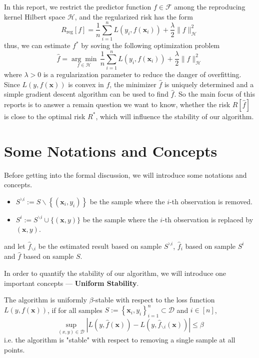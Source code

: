 \documentclass[a4paper, 12pt, mtpro2, authoryear]{elegantpaper}
\begin{document}
In this report, we restrict the predictor function $f\in\mathcal{F}$ among the reproducing kernel Hilbert space $\mathcal{H}$, and the regularized risk has the form
\begin{equation}
    \label{eq:regularized-risk-of-rkhs}
    R_{\text{reg}}[f]=\frac{1}{n}\sum_{i=1}^{n}L\left(y_{i},f(\mathbf{x}_{i})\right)+\frac{\lambda}{2}\|f\|_{\mathcal{H}}^{2}
\end{equation}
thus, we can estimate $f^{*}$ by soving the following optimization problem
\begin{equation}
    \hat{f}=\underset{f\in\mathcal{H}}{\arg\min}\,\frac{1}{n}\sum_{i=1}^{n}L\left(y_{i},f(\mathbf{x}_{i})\right)+\frac{\lambda}{2}\|f\|_{\mathcal{H}}^{2}
\end{equation}
where $\lambda>0$ is a regularization parameter to reduce the danger of overfitting. Since $L\left(y,f(\mathbf{x})\right)$ is convex in $f$, the minimizer $\hat{f}$ is uniquely determined and a simple gradient descent algorithm can be used to find $\hat{f}$. So the main focus of this reports is to answer a remain question we want to know, whether the risk $R[\hat{f}]$ is close to the optimal risk $R^{*}$, which will influence the stability of our algorithm.

\section{Some Notations and Concepts}

\noindent Before getting into the formal discussion, we will introduce some notations and concepts.
\begin{itemize}
    \item $S^{\backslash i}:=S\backslash\left\{(\mathbf{x}_{i},y_{i})\right\}$ be the sample where the $i$-th observation is removed.
    \item $S^{i}:=S^{\backslash i}\cup\{(\mathbf{x},y)\}$ be the sample where the $i$-th observation is replaced by $(\mathbf{x},y)$.
\end{itemize}
and let $\hat{f}_{\backslash i}$ be the estimated result based on sample $S^{\backslash i}$, $\hat{f}_{i}$ based on sample $S^{i}$ and $\hat{f}$ based on sample $S$.

In order to quantify the stability of our algorithm, we will introduce one important concepts --- \textbf{Uniform Stability}.
\begin{definition}
    \label{def:uniform-stability}
    The algorithm is uniformly $\beta$-stable with respect to the loss function $L\left(y,f(\mathbf{x})\right)$, if for all samples $S:=\left\{\mathbf{x}_{i},y_{i}\right\}_{i=1}^{n}\subset\mathcal{D}$ and $i\in[n]$,
    \begin{equation}
        \sup_{(x,y)\in\mathcal{D}}\left|L\left(y,\hat{f}(\mathbf{x})\right)-L\left(y,\hat{f}_{\backslash i}(\mathbf{x})\right)\right|\leq\beta
    \end{equation}
    i.e. the algorithm is "stable" with respect to removing a single sample at all points.
\end{definition}
\end{document}
